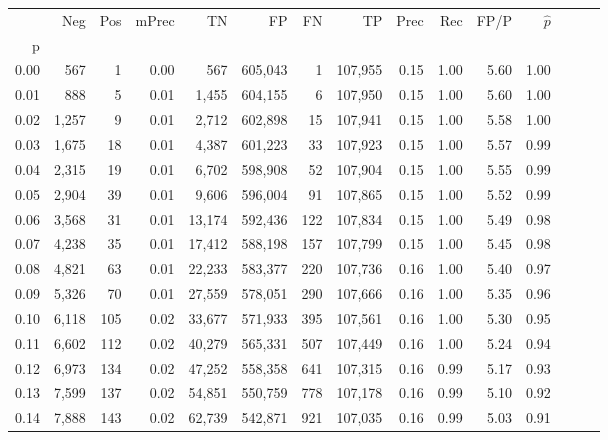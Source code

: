 \begin{tabular}{rrrrrrrrrrrrrrr}
\toprule
{} &     Neg &    Pos & mPrec &       TN &       FP &       FN &       TP &  Prec &   Rec &  FP/P & $\hat{p}$ \\
p    &         &        &       &          &          &          &          &       &       &       &           \\
\midrule
0.00 &     567 &      1 &  0.00 &      567 &  605,043 &        1 &  107,955 &  0.15 &  1.00 &  5.60 &      1.00 \\
0.01 &     888 &      5 &  0.01 &    1,455 &  604,155 &        6 &  107,950 &  0.15 &  1.00 &  5.60 &      1.00 \\
0.02 &   1,257 &      9 &  0.01 &    2,712 &  602,898 &       15 &  107,941 &  0.15 &  1.00 &  5.58 &      1.00 \\
0.03 &   1,675 &     18 &  0.01 &    4,387 &  601,223 &       33 &  107,923 &  0.15 &  1.00 &  5.57 &      0.99 \\
0.04 &   2,315 &     19 &  0.01 &    6,702 &  598,908 &       52 &  107,904 &  0.15 &  1.00 &  5.55 &      0.99 \\
0.05 &   2,904 &     39 &  0.01 &    9,606 &  596,004 &       91 &  107,865 &  0.15 &  1.00 &  5.52 &      0.99 \\
0.06 &   3,568 &     31 &  0.01 &   13,174 &  592,436 &      122 &  107,834 &  0.15 &  1.00 &  5.49 &      0.98 \\
0.07 &   4,238 &     35 &  0.01 &   17,412 &  588,198 &      157 &  107,799 &  0.15 &  1.00 &  5.45 &      0.98 \\
0.08 &   4,821 &     63 &  0.01 &   22,233 &  583,377 &      220 &  107,736 &  0.16 &  1.00 &  5.40 &      0.97 \\
0.09 &   5,326 &     70 &  0.01 &   27,559 &  578,051 &      290 &  107,666 &  0.16 &  1.00 &  5.35 &      0.96 \\
0.10 &   6,118 &    105 &  0.02 &   33,677 &  571,933 &      395 &  107,561 &  0.16 &  1.00 &  5.30 &      0.95 \\
0.11 &   6,602 &    112 &  0.02 &   40,279 &  565,331 &      507 &  107,449 &  0.16 &  1.00 &  5.24 &      0.94 \\
0.12 &   6,973 &    134 &  0.02 &   47,252 &  558,358 &      641 &  107,315 &  0.16 &  0.99 &  5.17 &      0.93 \\
0.13 &   7,599 &    137 &  0.02 &   54,851 &  550,759 &      778 &  107,178 &  0.16 &  0.99 &  5.10 &      0.92 \\
0.14 &   7,888 &    143 &  0.02 &   62,739 &  542,871 &      921 &  107,035 &  0.16 &  0.99 &  5.03 &      0.91 \\

\end{tabular}
